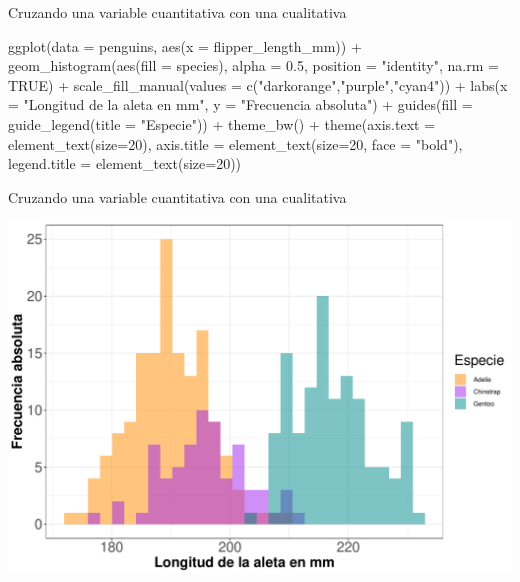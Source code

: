 \documentclass[
  ignorenonframetext,
  aspectratio=169]{beamer}
\newenvironment{Shaded}{\begin{snugshade}}{\end{snugshade}}
\newcommand{\AttributeTok}[1]{\textcolor[rgb]{0.77,0.63,0.00}{#1}}
\newcommand{\ConstantTok}[1]{\textcolor[rgb]{0.00,0.00,0.00}{#1}}
\newcommand{\DecValTok}[1]{\textcolor[rgb]{0.00,0.00,0.81}{#1}}
\newcommand{\FloatTok}[1]{\textcolor[rgb]{0.00,0.00,0.81}{#1}}
\newcommand{\FunctionTok}[1]{\textcolor[rgb]{0.00,0.00,0.00}{#1}}
\newcommand{\NormalTok}[1]{#1}
\newcommand{\SpecialCharTok}[1]{\textcolor[rgb]{0.00,0.00,0.00}{#1}}
\newcommand{\StringTok}[1]{\textcolor[rgb]{0.31,0.60,0.02}{#1}}
\begin{document}
\begin{frame}[fragile]{Cruzando una variable cuantitativa con una
cualitativa}
\protect\hypertarget{cruzando-una-variable-cuantitativa-con-una-cualitativa}{}
\begin{Shaded}
\begin{Highlighting}[]
\FunctionTok{ggplot}\NormalTok{(}\AttributeTok{data =}\NormalTok{ penguins, }\FunctionTok{aes}\NormalTok{(}\AttributeTok{x =}\NormalTok{ flipper\_length\_mm)) }\SpecialCharTok{+}
  \FunctionTok{geom\_histogram}\NormalTok{(}\FunctionTok{aes}\NormalTok{(}\AttributeTok{fill =}\NormalTok{ species), }
                 \AttributeTok{alpha =} \FloatTok{0.5}\NormalTok{, }
                 \AttributeTok{position =} \StringTok{"identity"}\NormalTok{,}
                 \AttributeTok{na.rm =} \ConstantTok{TRUE}\NormalTok{) }\SpecialCharTok{+}
  \FunctionTok{scale\_fill\_manual}\NormalTok{(}\AttributeTok{values =} \FunctionTok{c}\NormalTok{(}\StringTok{"darkorange"}\NormalTok{,}\StringTok{"purple"}\NormalTok{,}\StringTok{"cyan4"}\NormalTok{)) }\SpecialCharTok{+}
  \FunctionTok{labs}\NormalTok{(}\AttributeTok{x =} \StringTok{"Longitud de la aleta en mm"}\NormalTok{,}
       \AttributeTok{y =} \StringTok{"Frecuencia absoluta"}\NormalTok{) }\SpecialCharTok{+}
  \FunctionTok{guides}\NormalTok{(}\AttributeTok{fill =} \FunctionTok{guide\_legend}\NormalTok{(}\AttributeTok{title =} \StringTok{"Especie"}\NormalTok{)) }\SpecialCharTok{+}
  \FunctionTok{theme\_bw}\NormalTok{() }\SpecialCharTok{+}
  \FunctionTok{theme}\NormalTok{(}\AttributeTok{axis.text =} \FunctionTok{element\_text}\NormalTok{(}\AttributeTok{size=}\DecValTok{20}\NormalTok{),}
        \AttributeTok{axis.title =} \FunctionTok{element\_text}\NormalTok{(}\AttributeTok{size=}\DecValTok{20}\NormalTok{, }\AttributeTok{face =} \StringTok{"bold"}\NormalTok{),}
        \AttributeTok{legend.title =} \FunctionTok{element\_text}\NormalTok{(}\AttributeTok{size=}\DecValTok{20}\NormalTok{))}
\end{Highlighting}
\end{Shaded}
\end{frame}

\begin{frame}{Cruzando una variable cuantitativa con una cualitativa}
\protect\hypertarget{cruzando-una-variable-cuantitativa-con-una-cualitativa-1}{}
\begin{center}\includegraphics[width=0.6\linewidth,height=0.6\textheight]{tidyverse_AD_files/figure-beamer/unnamed-chunk-134-1} \end{center}
\end{frame}
\end{document}
